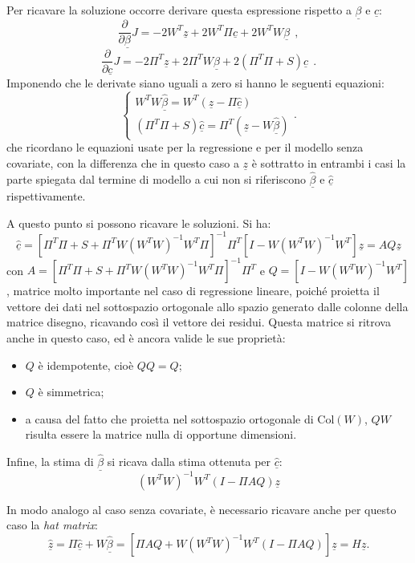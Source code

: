 \documentclass[a4paper,11pt,twoside,openright]{book}							%
\begin{document}
Per ricavare la soluzione occorre derivare questa espressione rispetto a $\underline \beta$ e $\underline c$:
$$
\frac{\partial}{\partial \underline \beta}J= -2W^T \underline z + 2W^T \Pi \underline c + 2 W^TW \underline \beta \ \ ,
$$
$$
\frac{\partial}{\partial \underline c}J= -2 \Pi^T \underline z + 2 \Pi^T W \underline \beta + 2(\Pi^T \Pi + S) \underline c \ \ .
$$
Imponendo che le derivate siano uguali a zero si hanno le seguenti equazioni:
$$
\begin{cases}
W^TW \hat{\underline \beta} = W^T(\underline z - \Pi \hat{\underline c})  \\
(\Pi^T \Pi + S) \hat{\underline c}=\Pi^T(\underline z -W \hat{\underline \beta})
\end{cases}.
$$
che ricordano le equazioni usate per la regressione e per il modello senza covariate, con la differenza che in questo caso a $\underline z$ è sottratto in entrambi i casi la parte spiegata dal termine di modello a cui non si riferiscono $\hat{\underline \beta}$ e $\hat{\underline c}$ rispettivamente.

A questo punto si possono ricavare le soluzioni. Si ha:
$$
\hat  {\underline c}=[\Pi^T\Pi+S+\Pi^TW(W^TW)^{-1}W^T\Pi]^{-1}\Pi^T[I-W(W^TW)^{-1}W^T]\underline z=AQ \underline z
$$
con $A=[\Pi^T\Pi+S+\Pi^TW(W^TW)^{-1}W^T\Pi]^{-1}\Pi^T$ e $Q=[I-W(W^TW)^{-1}W^T]$, matrice molto importante nel caso di regressione lineare, poiché proietta il vettore dei dati nel sottospazio ortogonale allo spazio generato dalle colonne della matrice disegno, ricavando così il vettore dei residui. Questa matrice si ritrova anche in questo caso, ed è ancora valide le sue proprietà:
\begin{itemize}
\item $Q$ è idempotente, cioè $QQ=Q$;
\item $Q$ è simmetrica;
\item a causa del fatto che proietta nel sottospazio ortogonale di $\mathrm{Col}(W)$, $QW$ risulta essere la matrice nulla di opportune dimensioni. 
\end{itemize}

Infine, la stima di $\hat  {\underline \beta}$ si ricava dalla stima ottenuta per $\hat  {\underline c}$:
$$
(W^TW)^{-1}W^T(I-\Pi AQ)\underline z
$$

In modo analogo al caso senza covariate, è necessario ricavare anche per questo caso la \textit{hat matrix}:
$$
\hat  {\underline z} =\Pi\hat  {\underline c} + W \hat  {\underline \beta} = [\Pi AQ + W(W^TW)^{-1}W^T(I-\Pi AQ)]\underline z = H\underline z .
$$
\end{document}
